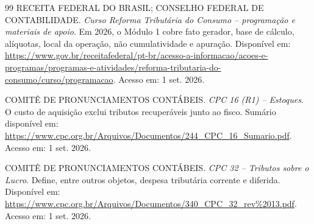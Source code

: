 \documentclass[11pt,a4paper]{article}
\begin{document}
\begin{thebibliography}{99}
RECEITA FEDERAL DO BRASIL; CONSELHO FEDERAL DE CONTABILIDADE. \textit{Curso Reforma Tributária do Consumo -- programação e materiais de apoio}. Em 2026, o Módulo 1 cobre fato gerador, base de cálculo, alíquotas, local da operação, não cumulatividade e apuração. Disponível em: \url{https://www.gov.br/receitafederal/pt-br/acesso-a-informacao/acoes-e-programas/programas-e-atividades/reforma-tributaria-do-consumo/curso/programacao}. Acesso em: 1 set. 2026.

COMITÊ DE PRONUNCIAMENTOS CONTÁBEIS. \textit{CPC 16 (R1) -- Estoques}. O custo de aquisição exclui tributos recuperáveis junto ao fisco. Sumário disponível em: \url{https://www.cpc.org.br/Arquivos/Documentos/244_CPC_16_Sumario.pdf}. Acesso em: 1 set. 2026.

COMITÊ DE PRONUNCIAMENTOS CONTÁBEIS. \textit{CPC 32 -- Tributos sobre o Lucro}. Define, entre outros objetos, despesa tributária corrente e diferida. Disponível em: \url{https://www.cpc.org.br/Arquivos/Documentos/340_CPC_32_rev%2013.pdf}. Acesso em: 1 set. 2026.

\end{thebibliography}
\end{document}
